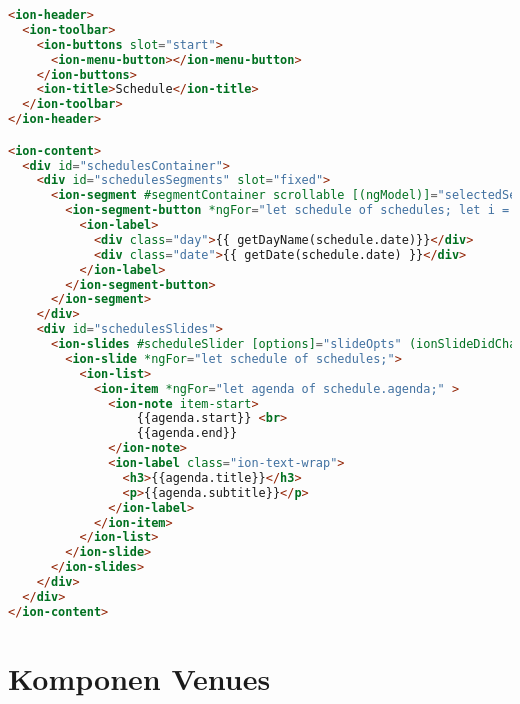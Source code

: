 \begin{lstlisting}[language=html, label={lst:schedule.page.html}, caption=schedule.page.html]
<ion-header>
  <ion-toolbar>
    <ion-buttons slot="start">
      <ion-menu-button></ion-menu-button>
    </ion-buttons>
    <ion-title>Schedule</ion-title>
  </ion-toolbar>
</ion-header>

<ion-content>
  <div id="schedulesContainer">
    <div id="schedulesSegments" slot="fixed">
      <ion-segment #segmentContainer scrollable [(ngModel)]="selectedSegmentIdx"  (ionChange)="onSegmentChanged($event)"> 
        <ion-segment-button *ngFor="let schedule of schedules; let i = index;" [value]="i" [id]="i">
          <ion-label>
            <div class="day">{{ getDayName(schedule.date)}}</div>
            <div class="date">{{ getDate(schedule.date) }}</div>
          </ion-label>
        </ion-segment-button>
      </ion-segment>
    </div>
    <div id="schedulesSlides">
      <ion-slides #scheduleSlider [options]="slideOpts" (ionSlideDidChange)="onSlideChanged()">
        <ion-slide *ngFor="let schedule of schedules;">
          <ion-list>
            <ion-item *ngFor="let agenda of schedule.agenda;" >
              <ion-note item-start>
                  {{agenda.start}} <br> 
                  {{agenda.end}}
              </ion-note>
              <ion-label class="ion-text-wrap">
                <h3>{{agenda.title}}</h3>
                <p>{{agenda.subtitle}}</p>
              </ion-label>
            </ion-item>
          </ion-list>
        </ion-slide>
      </ion-slides>
    </div>
  </div>
</ion-content>

\end{lstlisting}

\section{Komponen Venues} 
\label{sec:lampiranKomponenVenues}

